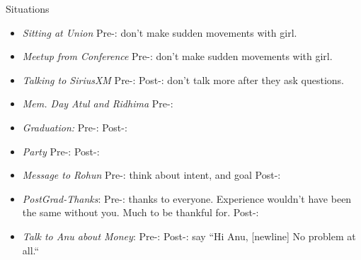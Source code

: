 \documentclass[serif, mathserif, final]{beamer}
\begin{document}
\begin{frame}{}
\begin{columns}
\begin{column}{0.20\linewidth}
\begin{block}{Situations}
\begin{itemize}
\tiny \item \tiny \textit{Sitting at Union} Pre-: don't make
        sudden movements with girl.
      \item \tiny \textit{Meetup from Conference} Pre-: don't make
        sudden movements with girl.  
        \item \tiny \textit{Talking to SiriusXM} Pre-:  Post-: don't
          talk more after they ask questions.  

        \item \tiny \textit{Mem. Day Atul and Ridhima} Pre-: 
      \item \tiny \textit{Graduation:} Pre-:   Post-: 
      \item \tiny \textit{Party } Pre-:  Post-:

      \item \tiny \textit{Message to Rohun} Pre-: think about intent,
        and goal Post-: 
        \item \tiny \textit{PostGrad-Thanks}: Pre-: thanks to
          everyone. Experience wouldn't have been the same without
          you. Much to be thankful for. Post-: %
          \item \tiny \textit{Talk to Anu about Money}: Pre-:   Post-:
            say ``Hi Anu,  [newline] No problem at all.`` 
    \end{itemize}
  \end{block}
\end{column}%
\end{columns}

\end{frame}
\end{document}
